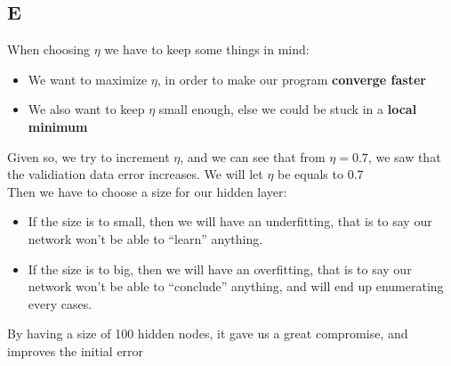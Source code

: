 \documentclass{article}
\begin{document}
        \subsection{E}
            When choosing $\eta$ we have to keep some things in mind:
            \begin{itemize}
                \item We want to maximize $\eta$, in order to make our program \textbf{converge faster}
                \item We also want to keep $\eta$ small enough, else we could be stuck in a \textbf{local minimum}
            \end{itemize}
            Given so, we try to increment $\eta$, and we can see that from $\eta=0.7$, we saw that the validiation data error increases. We will let $\eta$ be equals to 0.7\\

            Then we have to choose a size for our hidden layer:
            \begin{itemize}
                \item If the size is to small, then we will have an underfitting, that is to say our network won't be able to ``learn'' anything.
                \item If the size is to big, then we will have an overfitting, that is to say our network won't be able to ``conclude'' anything, and will end up enumerating every cases.
            \end{itemize}
            By having a size of 100 hidden nodes, it gave us a great compromise, and improves the initial error
\end{document}
